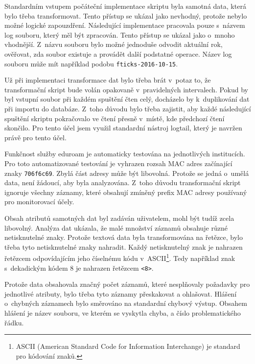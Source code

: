 \documentclass[thesis=M,czech]{FITthesis}[2012/06/26]
\begin{document}
      Standardním vstupem počáteční implementace skriptu byla samotná data, která bylo třeba transformovat.
      Tento přístup se ukázal jako nevhodný, protože nebylo možné logické zapouzdření.
      Následující implementace pracovala pouze s~názvem log souboru, který měl být zpracován.
      Tento přístup se ukázal jako o~mnoho vhodnější. 
      Z~názvu souboru bylo možné jednoduše odvodit aktuální rok, 
      ověřovat, zda soubor existuje a provádět další podstatné operace.
      Název log souboru může mít například podobu \verb|fticks-2016-10-15|.

      Už při implementaci transformace dat bylo třeba brát v~potaz to,
      že transformační skript bude volán opakovaně v~pravidelných intervalech.
      Pokud by byl vstupní soubor při každém spuštění čten celý, docházelo by
      k~duplikování dat při importu do databáze.
      Z~toho důvodu bylo třeba zajistit, 
      aby každé následující spuštění skriptu pokračovalo ve čtení přesně v~místě,
      kde předchozí čtení skončilo.
      Pro tento účel jsem využil standardní nástroj logtail, který je navržen právě pro tento účel.

      Funkčnost služby eduroam je automaticky testována na jednotlivých institucích.
      Pro toto automatizované testování je vyhrazen rozsah MAC adres začínající znaky \verb|706f6c69|.
      Zbylá část adresy může být libovolná. 
      Protože se jedná o~umělá data, není žádoucí, aby byla analyzována.
      Z~toho důvodu transformační skript ignoruje všechny záznamy, 
      které obsahují zmíněný prefix MAC adresy používaný pro monitorovací účely.

      Obsah atributů samotných dat byl zadáván uživatelem, mohl být tudíž zcela libovolný.
      Analýza dat ukázala, že malé množství záznamů obsahuje různé netisknutelné znaky.
      Protože textová data byla transformována na řetězce, bylo třeba tyto 
      netisknutelné znaky nahradit.
      Každý netisknutelný znak je nahrazen řetězcem odpovídajícím jeho číselnému kódu v~ASCII\footnote{
        ASCII (American Standard Code for Information Interchange) je standard pro kódování znaků.
      }.
      Tedy například znak s~dekadickým kódem 8 je nahrazen řetězcem \verb|<8>|.

      Protože data obsahovala značný počet záznamů, které nesplňovaly požadavky pro jednotlivé atributy,
      bylo třeba tyto záznamy přeskakovat a ohlašovat.
      Hlášení o~chybných záznamech bylo směrováno na standardní chybový výstup.
      Obsahem hlášení je název souboru, ve kterém se vyskytla chyba, a číslo problematického řádku.
      
\end{document}
